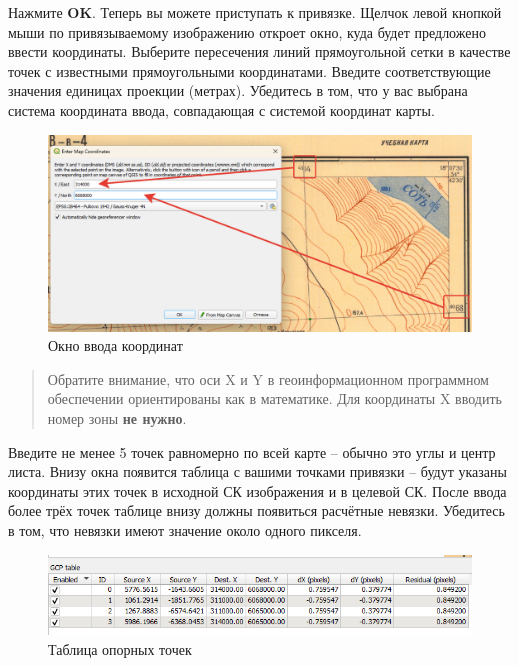 \documentclass[
  12pt,
]{book}
\begin{document}
Нажмите \textbf{OK}. Теперь вы можете приступать к привязке. Щелчок левой кнопкой мыши по привязываемому изображению откроет окно, куда будет предложено ввести координаты. Выберите пересечения линий прямоугольной сетки в качестве точек с известными прямоугольными координатами. Введите соответствующие значения единицах проекции (метрах). Убедитесь в том, что у вас выбрана система координата ввода, совпадающая с системой координат карты.

\begin{figure}
\centering
\includegraphics{images/Georeference/Input_Coordinates.png}
\caption{Окно ввода координат}
\end{figure}

\begin{quote}
Обратите внимание, что оси X и Y в геоинформационном программном обеспечении ориентированы как в математике. Для координаты X вводить номер зоны \textbf{не нужно}.
\end{quote}

Введите не менее 5 точек равномерно по всей карте -- обычно это углы и центр листа. Внизу окна появится таблица с вашими точками привязки -- будут указаны координаты этих точек в исходной СК изображения и в целевой СК. После ввода более трёх точек таблице внизу должны появиться расчётные невязки. Убедитесь в том, что невязки имеют значение около одного пикселя.

\begin{figure}
\centering
\includegraphics{images/Georeference/GCP_Table.png}
\caption{Таблица опорных точек}
\end{figure}
\end{document}
